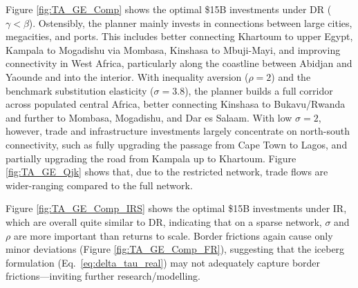 \documentclass[a4paper]{article}
\begin{document}
Figure \ref{fig:TA_GE_Comp} shows the optimal \$15B investments under DR ($\gamma < \beta$). Ostensibly, the planner mainly invests in connections between large cities, megacities, and ports. This includes better connecting Khartoum to upper Egypt, Kampala to Mogadishu via Mombasa, Kinshasa to Mbuji-Mayi, and improving connectivity in West Africa, particularly along the coastline between Abidjan and Yaounde and into the interior. With inequality aversion ($\rho = 2$) and the benchmark substitution elasticity ($\sigma = 3.8$), the planner builds a full corridor across populated central Africa, better connecting Kinshasa to Bukavu/Rwanda and further to Mombasa, Mogadishu, and Dar es Salaam. With low $\sigma = 2$, however, trade and infrastructure investments largely concentrate on north-south connectivity, such as fully upgrading the passage from Cape Town to Lagos, and partially upgrading the road from Kampala up to Khartoum. Figure \ref{fig:TA_GE_Qjk} shows that, due to the restricted network, trade flows are wider-ranging compared to the full network. \newline 

Figure \ref{fig:TA_GE_Comp_IRS} shows the optimal \$15B investments under IR, which are overall quite similar to DR, indicating that on a sparse network, $\sigma$ and $\rho$ are more important than returns to scale. Border frictions again cause only minor deviations (Figure \ref{fig:TA_GE_Comp_FR}), suggesting that the iceberg formulation (Eq.\ \ref{eq:delta_tau_real}) may not adequately capture border frictions---inviting further research/modelling. %
\end{document}
